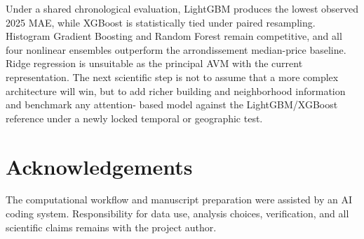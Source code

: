 \documentclass[11pt,a4paper]{article}
\begin{document}
Under a shared chronological evaluation, LightGBM produces the lowest observed
2025 MAE, while XGBoost is statistically tied under paired resampling. Histogram
Gradient Boosting and Random Forest remain competitive, and all four nonlinear
ensembles outperform the arrondissement median-price baseline. Ridge regression
is unsuitable as the principal AVM with the current representation. The next
scientific step is not to assume that a more complex architecture will win, but
to add richer building and neighborhood information and benchmark any attention-
based model against the LightGBM/XGBoost reference under a newly locked temporal
or geographic test.

\section*{Acknowledgements}
The computational workflow and manuscript preparation were assisted by an AI
coding system. Responsibility for data use, analysis choices, verification, and
all scientific claims remains with the project author.



\end{document}
